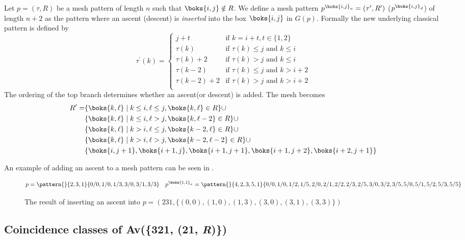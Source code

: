 \begin{definition}
Let \(p=(\tau,R)\) be a mesh pattern of length \(n\) such that \(\boks{i,j}\notin R\). We define
a mesh pattern \(p^{\boks{i,j}_a} = (\tau^\prime,R^\prime)\) (\(p^{\boks{i,j}_d}\)) of length \(n+2\)
as the pattern where an ascent (descent) is \emph{inserted} into the box \(\boks{i,j}\) in \(G(p)\). Formally the new underlying classical
pattern is defined by
\begin{equation*}
\tau^\prime(k) = \begin{cases}
    j+t & \text{if } k = i+t,t\in\{1,2\}\\
    \tau(k) & \text{if } \tau(k)\le j \text{ and }k\le i\\
    \tau(k)+2 & \text{if } \tau(k)> j \text{ and }k\le i\\
    \tau(k-2) & \text{if } \tau(k)\le j \text{ and }k> i+2\\
    \tau(k-2)+2 & \text{if } \tau(k)> j \text{ and }k> i+2\\
\end{cases} 
\end{equation*}
The ordering of the top branch determines whether an ascent(or descent) is added.
The mesh becomes
\begin{equation*}
\begin{aligned}
R^\prime=&\{\boks{k,\ell}\mid k\le i, \ell\le j, \boks{k,\ell}\in R\} \cup\\
&\{\boks{k,\ell}\mid k\le i, \ell > j, \boks{k,\ell-2}\in R\}\cup\\
&\{\boks{k,\ell}\mid k > i, \ell \le j, \boks{k-2,\ell}\in R\}\cup\\
&\{\boks{k,\ell}\mid k > i, \ell > j, \boks{k-2,\ell-2}\in R\}\cup\\
&\{\boks{i,j+1},\boks{i+1,j},\boks{i+1,j+1},\boks{i+1,j+2},\boks{i+2,j+1}\}
\end{aligned}
\end{equation*}
\end{definition}
An example of adding an ascent to a mesh pattern can be seen in .
\begin{figure}
\begin{equation*}
p = \pattern{}{2,3,1}{0/0,1/0,1/3,
                      3/0,3/1,3/3} \quad
p^{\boks{1,1}_a}= \pattern{}{4,2,3,5,1}{0/0,
                        1/0,1/2,1/5,
                        2/0,2/1,2/2,2/3,2/5,
                        3/0,3/2,3/5,
                        5/0,5/1,5/2,5/3,5/5}
\end{equation*}
\caption{The result of inserting an ascent into \(p=(231,\{(0,0),(1,0),(1,3),(3,0),(3,1),(3,3)\})\)}
\label{fig:adda}
\end{figure}

\subsection{Coincidence classes of Av(\{321, (21, \textit{R})\})}